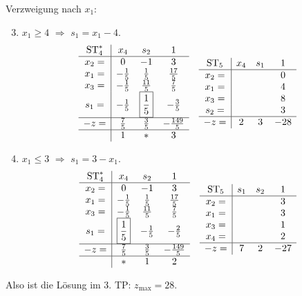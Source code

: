 \begin{exmp}
  Verzweigung nach $x_1$:
  \begin{enumerate}[1. TP]
    \setcounter{enumi}{2}
  \item $x_1 \ge 4$ $\Rightarrow$ $s_1 = x_1 - 4$.
    \[
      \begin{array}{c|ccc}
        \operatorname*{ST}_4^* & x_4 & s_2 & 1 \\
        \hline
        x_2 = & 0 & -1 & 3 \\
        x_1 = & -\frac{1}{5} & \frac{1}{5} & \frac{17}{5} \\
        x_3 = & -\frac{1}{5} & \frac{11}{5} & \frac{7}{5} \\
        s_1 = & -\frac{1}{5} & \boxed{\frac{1}{5}} & -\frac{3}{5} \\
        \hline
        - z = & \frac{7}{5} & \frac{3}{5} & -\frac{149}{5} \\
        \hline
                & 1 & \ast & 3 
      \end{array}
      \quad
      \begin{array}{c|ccc}
        \operatorname*{ST}_5 & x_4 & s_1 & 1 \\
        \hline
        x_2 = & & & 0 \\
        x_1 = & & & 4 \\
        x_3 = & & & 8 \\
        s_2 = & & & 3 \\
        \hline
        - z = & 2 & 3 & -28
      \end{array}
    \]
  \item $x_1 \le 3$ $\Rightarrow$ $s_1 = 3 - x_1$.
    \[
      \begin{array}{c|ccc}
        \operatorname*{ST}_4^* & x_4 & s_2 & 1 \\
        \hline
        x_2 = & 0 & -1 & 3 \\
        x_1 = & -\frac{1}{5} & \frac{1}{5} & \frac{17}{5} \\
        x_3 = & -\frac{1}{5} & \frac{11}{5} & \frac{7}{5} \\
        s_1 = & \boxed{\frac{1}{5}} & -\frac{1}{5} & -\frac{2}{5} \\
        \hline
        - z = & \frac{7}{5} & \frac{3}{5} & -\frac{149}{5} \\
        \hline
                & \ast & 1 & 2 
      \end{array}
      \quad
      \begin{array}{c|ccc}
        \operatorname*{ST}_5 & s_1 & s_2 & 1 \\
        \hline
        x_2 = & & & 3 \\
        x_1 = & & & 3 \\
        x_3 = & & & 1 \\
        x_4 = & & & 2 \\
        \hline
        - z = & 7 & 2 & -27
      \end{array}
    \]
  \end{enumerate}
  Also ist die Lösung im 3. TP: $z_{\max} = 28$.
\end{exmp}

